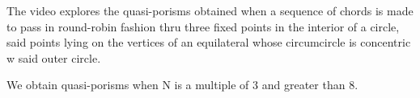The video explores the quasi-porisms obtained when a sequence of chords is made to pass in round-robin fashion thru three fixed points in the interior of a circle, said points lying on the vertices of an equilateral whose circumcircle is concentric w said outer circle.

We obtain quasi-porisms when N is a multiple of 3 and greater than 8.